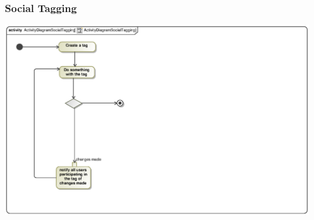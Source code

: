 \documentclass[hidelinks, 12pt, oneside]{article}
\begin{document}
\subsubsection{Social Tagging}
\includegraphics[scale=.9]{Semaka/graphics/activityDiagramSocialTagging.eps}\\
\end{document}
